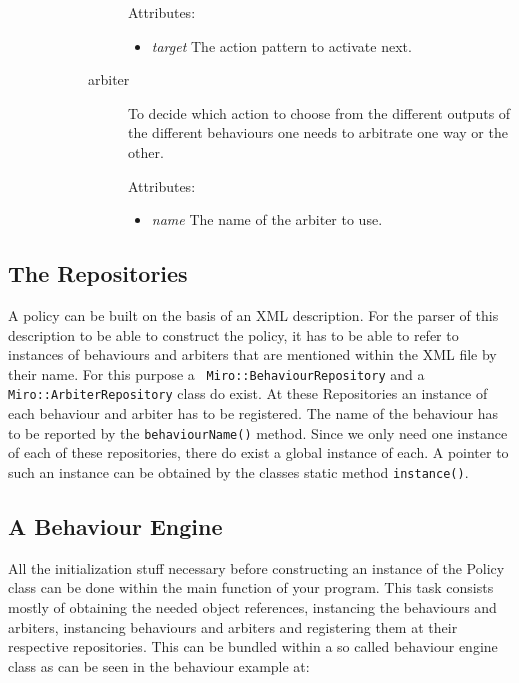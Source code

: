 \begin{description}
\begin{description}
\begin{description}
      Attributes: 
      \begin{itemize}
      \item \textit{target} The action pattern to activate next.
      \end{itemize}  

    \item[arbiter]
      To decide which action to choose from the different outputs of
      the different behaviours one needs to arbitrate one way or the other.

      Attributes: 
      \begin{itemize}
      \item \textit{name} The name of the arbiter to use.
      \end{itemize}
    \end{description}
  \end{description}
\end{description}

\subsection{The Repositories}

A policy can be built on the basis of an XML description. For the
parser of this description to be able to construct the policy, it has
to be able to refer to instances of behaviours and arbiters that are
mentioned within the XML file by their name.  For this purpose a {\tt
  Miro::BehaviourRepository} and a {\tt Miro::ArbiterRepository} class
do exist.  At these Repositories an instance of each behaviour and
arbiter has to be registered. The name of the behaviour has to be
reported by the {\tt behaviourName()} method.  Since we only need one
instance of each of these repositories, there do exist a global
instance of each. A pointer to such an instance can be obtained by
the classes static method {\tt instance()}.

\subsection{A Behaviour Engine}

All the initialization stuff necessary before constructing an instance
of the Policy class can be done within the main function of your
program. This task consists mostly of obtaining the needed object
references, instancing the behaviours and arbiters, instancing
behaviours and arbiters and registering them at their respective
repositories.  This can be bundled within a so called behaviour engine
class as can be seen in the behaviour example at:

